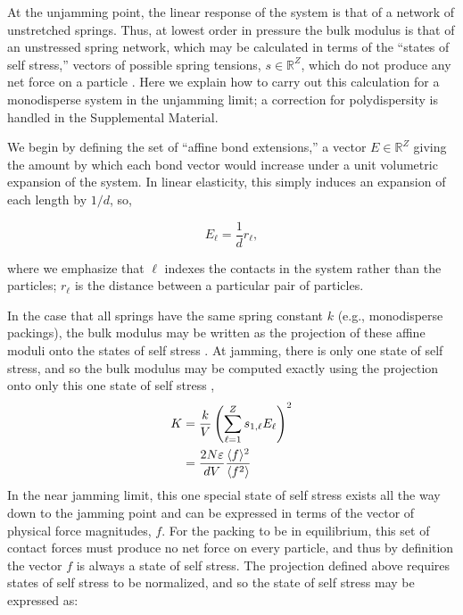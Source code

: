 At the unjamming point, the linear response of the system is that of a network of unstretched springs. Thus, at lowest order in pressure the bulk modulus is that of an unstressed spring network,  which may be calculated in terms of the ``states of self stress,'' vectors of possible spring tensions, $s\in \mathbb{R}^{Z}$, which do not produce any net force on a particle \cite{pellegrino_structural_1993, wyart_rigidity_2005, lubensky_phonons_2015}. Here we explain how to carry out this calculation for a monodisperse system in the unjamming limit; a correction for polydispersity is handled in the Supplemental Material.

We begin by defining the set of ``affine bond extensions,'' a vector $E \in \mathbb{R}^{Z}$ giving the amount by which each bond vector would increase under a unit volumetric expansion of the system. In linear elasticity, this simply induces an expansion of each length by $1/d$, so,

\begin{equation}
E_{\ell} = \frac{1}{d} r_{\ell}\label{eqn:affine},
\end{equation}

where we emphasize that $\ell$ indexes the contacts in the system rather than the particles; $r_{\ell}$ is the distance between a particular pair of particles.

In the case that all springs have the same spring constant $k$ (e.g., monodisperse packings), the bulk modulus may be written as the projection of these affine moduli onto the states of self stress \cite{pellegrino_structural_1993, wyart_rigidity_2005, lubensky_phonons_2015}. At jamming, there is only one state of self stress, and so the bulk modulus may be computed exactly using the projection onto only this one state of self stress \cite{wyart_rigidity_2005},
%
%
%
\begin{align}
    K&= \frac{k}{V}  \left(\sum_{\ell = 1}^{Z} s_{1,\ell} E_{\ell}  \right)^2\label{eqn:sssproj} \\
    &=\frac{2 N \varepsilon}{ d V} \frac{\langle  f \rangle^2}{\langle f^2 \rangle}
\end{align}
%
In the near jamming limit, this one special state of self stress exists all the way down to the jamming point and can be expressed in terms of the vector of physical force magnitudes, $f$. For the packing to be in equilibrium, this set of contact forces must produce no net force on every particle, and thus by definition the vector $f$ is always a state of self stress. The projection defined above requires states of self stress to be normalized, and so the state of self stress may be expressed as:

